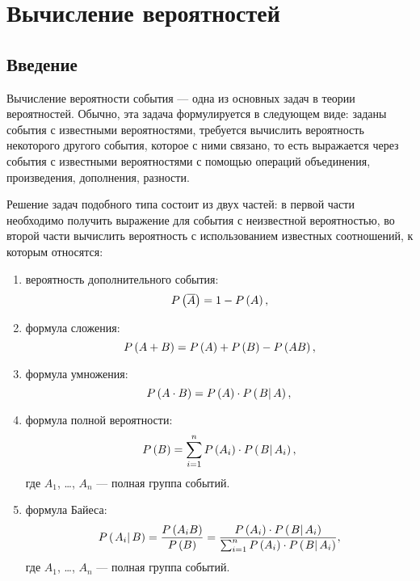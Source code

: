 \chapter{Вычисление вероятностей}

\section*{Введение}

Вычисление вероятности события --- одна из основных задач в теории вероятностей. Обычно, эта задача формулируется в следующем виде: заданы события с известными вероятностями,
требуется вычислить вероятность некоторого другого события, которое с ними связано, то есть выражается через события с известными вероятностями с помощью операций объединения,
произведения, дополнения, разности.

Решение задач подобного типа состоит из двух частей: в первой части необходимо получить выражение для события с неизвестной вероятностью, во второй части
вычислить вероятность с использованием известных соотношений, к которым относятся:
\begin{enumerate}
    \item вероятность дополнительного события:
    \begin{equation}
        P \left ( \overline{A} \right ) = 1 - P \left ( A \right ) ,
    \end{equation}

    \item формула сложения:
    \begin{equation}
        P \left ( A + B \right ) = P \left ( A \right ) + P \left ( B \right ) - P \left ( A B \right ) ,
    \end{equation}

    \item формула умножения:
    \begin{equation}
        P \left ( A \cdot B \right ) = P \left ( A \right ) \cdot P \left ( \left . B \right | A \right ),
    \end{equation}

    \item формула полной вероятности:
    \begin{equation}
        P \left ( B \right ) = \sum_{i=1}^n P \left ( A_i \right ) \cdot P \left ( \left . B \right | A_i \right ) ,
    \end{equation}
    где $A_1$, \dots, $A_n$ --- полная группа событий.

    \item формула Байеса:
    \begin{equation}
        P \left ( \left . A_i \right | B \right )
        = \frac{P \left ( A_iB \right )}{P \left ( B \right )}
        = \frac{P \left ( A_i \right ) \cdot P \left ( \left . B \right | A_i \right )}{\sum_{i=1}^n P \left ( A_i \right ) \cdot P \left ( \left . B \right | A_i \right )} ,
    \end{equation}
    где $A_1$, \dots, $A_n$ --- полная группа событий.
\end{enumerate}

